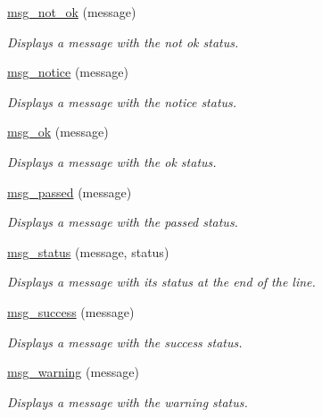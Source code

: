 \begin{DoxyCompactItemize}
\hyperlink{group__message_gadba552b40430d43c306129dccb9bb6ba}{msg\+\_\+not\+\_\+ok} (message)
\begin{DoxyCompactList}\small\item\em Displays a message with the \textquotesingle{}not ok\textquotesingle{} status. \end{DoxyCompactList}\item 
\hyperlink{group__message_ga61150f29d9ff1be264ec6d95a7b10161}{msg\+\_\+notice} (message)
\begin{DoxyCompactList}\small\item\em Displays a message with the \textquotesingle{}notice\textquotesingle{} status. \end{DoxyCompactList}\item 
\hyperlink{group__message_ga9f9b130e50d82e4ef3bf3554df755078}{msg\+\_\+ok} (message)
\begin{DoxyCompactList}\small\item\em Displays a message with the \textquotesingle{}ok\textquotesingle{} status. \end{DoxyCompactList}\item 
\hyperlink{group__message_ga9df650b1c1239ff41a66696efa81efcd}{msg\+\_\+passed} (message)
\begin{DoxyCompactList}\small\item\em Displays a message with the \textquotesingle{}passed\textquotesingle{} status. \end{DoxyCompactList}\item 
\hyperlink{group__message_gad80ab7ec02b8c2f8a2c53ff732a07db2}{msg\+\_\+status} (message, status)
\begin{DoxyCompactList}\small\item\em Displays a message with its status at the end of the line. \end{DoxyCompactList}\item 
\hyperlink{group__message_ga34a1aa638a3fb510d440f5de95a903dc}{msg\+\_\+success} (message)
\begin{DoxyCompactList}\small\item\em Displays a message with the \textquotesingle{}success\textquotesingle{} status. \end{DoxyCompactList}\item 
\hyperlink{group__message_gae7ed668c9e2b1cf86059082cc6e28024}{msg\+\_\+warning} (message)
\begin{DoxyCompactList}\small\item\em Displays a message with the \textquotesingle{}warning\textquotesingle{} status. \end{DoxyCompactList}\item 

\end{DoxyCompactItemize}
